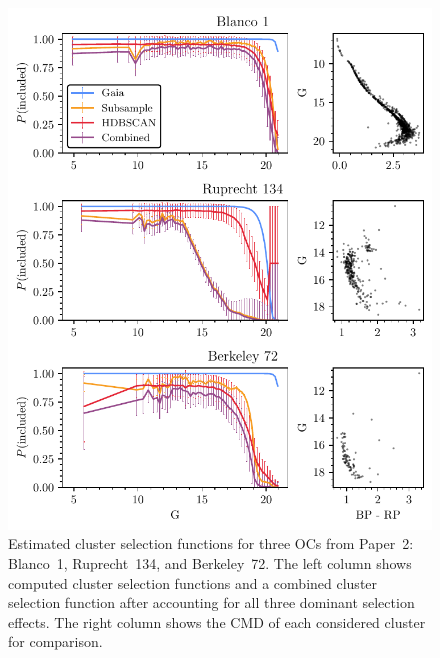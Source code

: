\begin{figure}[p]
    \centering
    \includegraphics[width=\textwidth]{fig/c4/mass_selection_functions.pdf}
    \caption[Estimated cluster selection functions for three OCs from Paper~2: Blanco~1, Ruprecht~134, and Berkeley~72]{Estimated cluster selection functions for three OCs from Paper~2: Blanco~1, Ruprecht~134, and Berkeley~72. The left column shows computed cluster selection functions and a combined cluster selection function after accounting for all three dominant selection effects. The right column shows the CMD of each considered cluster for comparison.}
    \label{fig:dynamics:masses:selection_effects}
\end{figure}

